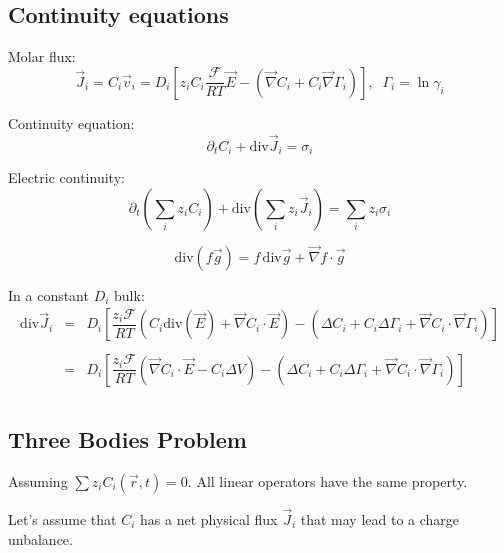 \documentclass[aps,12pt]{revtex4}
\begin{document}
\subsection{Continuity equations}

Molar flux:
\begin{equation}
	\vec{J}_i = C_i \vec{v}_i = D_i \left[z_i C_i  \dfrac{\mathcal{F}}{RT} \vec{E} - \left(\vec{\nabla} C_i + C_i \vec{\nabla}\Gamma_i\right) \right],\;\;\Gamma_i = \ln \gamma_i
\end{equation}

Continuity equation:
\begin{equation}
	\partial_t C_i + \mathrm{div} \vec{J}_i = \sigma_i
\end{equation}

Electric continuity:
\begin{equation}
	\partial_t \left(\sum_i z_i C_i\right) + \mathrm{div} \left(\sum_i z_i \vec{J}_i\right) = \sum_i z_i \sigma_i
\end{equation}


\begin{equation}
	\mathrm{div}(f\vec{g}) = f \, \mathrm{div}\vec{g} + \vec{\nabla} f \cdot \vec{g}
\end{equation}

In a constant $D_i$ bulk:
\begin{equation}
\begin{array}{rcl}
\mathrm{div} \vec{J}_i & = & D_i \left[ \dfrac{z_i\mathcal{F}}{RT} 
\left(C_i \mathrm{div}\left(\vec{E}\right) + \vec{\nabla} C_i \cdot \vec{E} \right) 
- \left( \Delta C_i + C_i \Delta \Gamma_i + \vec{\nabla} C_i \cdot \vec{\nabla} \Gamma_i \right)
\right]\\
\\
 & = &  D_i \left[ \dfrac{z_i\mathcal{F}}{RT} 
\left(  \vec{\nabla} C_i \cdot \vec{E} - C_i \Delta V \right) 
- \left( \Delta C_i + C_i \Delta \Gamma_i + \vec{\nabla} C_i \cdot \vec{\nabla} \Gamma_i \right)
\right]\\
\end{array}
\end{equation}

\subsection{Three Bodies Problem}

 	
Assuming $\sum z_i C_i(\vec{r},t) = 0$. All linear operators have the same property.

Let's assume that $C_i$ has a net physical flux $\vec{J}_i$ that may lead to a charge unbalance.
\end{document}
